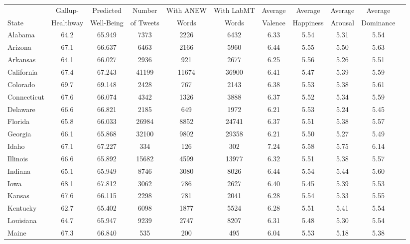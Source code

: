 \documentclass{acm_proc_article-sp}
\begin{document}
\begin{table}[t!]
\begin{center}
\scriptsize
\begin{tabular}{l c c c c c c c c c c }
	          & Gallup- & Predicted  & Number       & With ANEW      & With LabMT   & Average & Average    & Average & Average   \\
State         & Healthway & Well-Being & of Tweets    & Words & Words & Valence & Happiness  & Arousal & Dominance \\
\hline
\hline
Alabama        & 64.2 & 65.949 & 7373 & 2226 & 6432 &  6.33 & 5.54 & 5.31 & 5.54 \\
Arizona        & 67.1 & 66.637 & 6463 & 2166 & 5960 &  6.44 & 5.55 & 5.50 & 5.63 \\
Arkansas       & 64.1 & 66.027 & 2936 & 921 & 2677 &  6.25 & 5.56 & 5.26 & 5.51 \\
California     & 67.4 & 67.243 & 41199 & 11674 & 36900 &  6.41 & 5.47 & 5.39 & 5.59 \\
Colorado       & 69.7 & 69.148 & 2428 & 767 & 2143 &  6.38 & 5.53 & 5.38 & 5.61 \\
Connecticut    & 67.6 & 66.074 & 4342 & 1326 & 3888 &  6.37 & 5.52 & 5.34 & 5.59 \\
Delaware       & 66.6 & 66.821 & 2185 & 649 & 1972 &  6.21 & 5.53 & 5.24 & 5.45 \\
Florida        & 65.8 & 66.033 & 26984 & 8852 & 24741 & 6.37 & 5.51 & 5.38 & 5.57 \\
Georgia        & 66.1 & 65.868 & 32100 & 9802 & 29358 & 6.21 & 5.50 & 5.27 & 5.49 \\
Idaho          & 67.1 & 67.227 & 334 & 126 & 302 & 7.24 & 5.58 & 5.75 & 6.14 \\
Illinois       & 66.6 & 65.892 & 15682 & 4599 & 13977 & 6.32 & 5.51 & 5.38 & 5.57 \\
Indiana        & 65.1 & 65.949 & 8746 & 3080 & 8026 & 6.44 & 5.54 & 5.44 & 5.60 \\
Iowa           & 68.1 & 67.812 & 3062 & 786 & 2627 & 6.40 & 5.45 & 5.39 & 5.53 \\
Kansas         & 67.6 & 66.115 & 2298 & 781 & 2041 & 6.28 & 5.54 & 5.33 & 5.55 \\
Kentucky       & 62.7 & 65.402 & 6098 & 1877 & 5524 & 6.28 & 5.51 & 5.41 & 5.54 \\
Louisiana      & 64.7 & 65.947 & 9239 & 2747 & 8207 & 6.31 & 5.48 & 5.30 & 5.54 \\
Maine          & 67.3 & 66.840 & 535 & 200 & 495 & 6.04 & 5.53 & 5.18 & 5.38 \\

\end{tabular}
\end{center}
\end{table}
\end{document}
